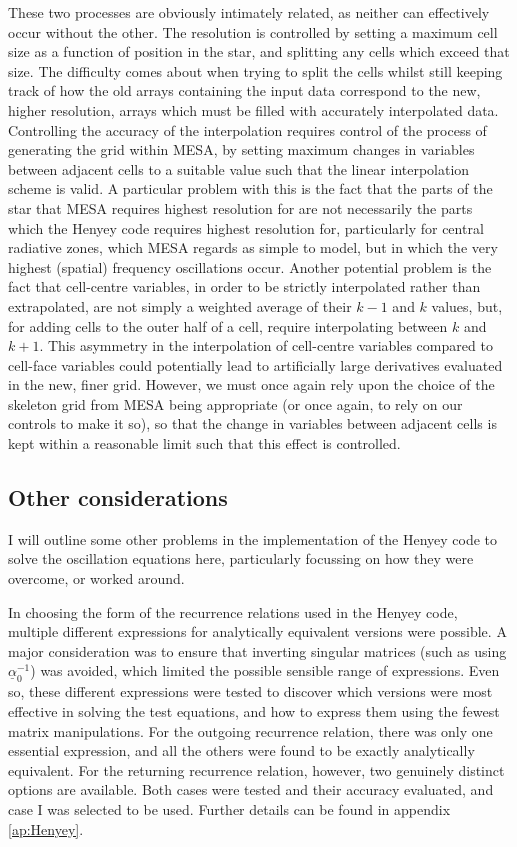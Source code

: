 \documentclass[11pt]{amsart}
\begin{document}
These two processes are obviously intimately related, as neither can effectively occur without the other.  The resolution is controlled by setting a maximum cell size as a function of position in the star, and splitting any cells which exceed that size.  The difficulty comes about when trying to split the cells whilst still keeping track of how the old arrays containing the input data correspond to the new, higher resolution, arrays which must be filled with accurately interpolated data.  Controlling the accuracy of the interpolation requires control of the process of generating the grid within MESA, by setting maximum changes in variables between adjacent cells to a suitable value such that the linear interpolation scheme is valid.  A particular problem with this is the fact that the parts of the star that MESA requires highest resolution for are not necessarily the parts which the Henyey code requires highest resolution for, particularly for central radiative zones, which MESA regards as simple to model, but in which the very highest (spatial) frequency oscillations occur.  Another potential problem is the fact that cell-centre variables, in order to be strictly interpolated rather than extrapolated, are not simply a weighted average of their $k-1$ and $k$ values, but, for adding cells to the outer half of a cell, require interpolating between $k$ and $k+1$.  This asymmetry in the interpolation of cell-centre variables compared to cell-face variables could potentially lead to artificially large derivatives evaluated in the new, finer grid.  However, we must once again rely upon the choice of the skeleton grid from MESA being appropriate (or once again, to rely on our controls to make it so), so that the change in variables between adjacent cells is kept within a reasonable limit such that this effect is controlled.



\subsection{Other considerations}   \label{Implement:Other}

I will outline some other problems in the implementation of the Henyey code to solve the oscillation equations here, particularly focussing on how they were overcome, or worked around.


In choosing the form of the recurrence relations used in the Henyey code, multiple different expressions for analytically equivalent versions were possible.  A major consideration was to ensure that inverting singular matrices (such as using $\underline{\alpha}_{0}^{-1}$) was avoided, which limited the possible sensible range of expressions.  Even so, these different expressions were tested to discover which versions were most effective in solving the test equations, and how to express them using the fewest matrix manipulations.  For the outgoing recurrence relation, there was only one essential expression, and all the others were found to be exactly analytically equivalent.  For the returning recurrence relation, however, two genuinely distinct options are available.  Both cases were tested and their accuracy evaluated, and case I was selected to be used.  Further details can be found in appendix \ref{ap:Henyey}.
\end{document}
